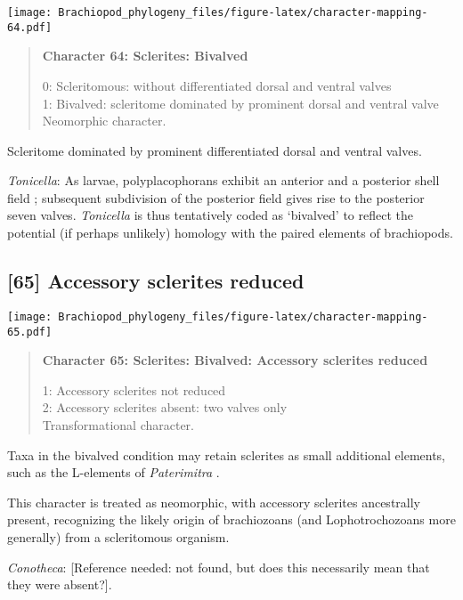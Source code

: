 \documentclass[openany]{book}
\theoremstyle{definition}
\theoremstyle{definition}
\theoremstyle{definition}
\theoremstyle{remark}
\begin{document}
\texttt{[image: Brachiopod\_phylogeny\_files/figure-latex/character-mapping-64.pdf]}

\begin{quote}
\textbf{Character 64: Sclerites: Bivalved}

0: Scleritomous: without differentiated dorsal and ventral valves\\
1: Bivalved: scleritome dominated by prominent dorsal and ventral
valve\\
Neomorphic character.
\end{quote}

Scleritome dominated by prominent differentiated dorsal and ventral
valves.

\hypertarget{Tonicella-coding-64}{}
\emph{Tonicella}: As larvae, polyplacophorans exhibit an anterior and a
posterior shell field \citep{Wanninger2002C}; subsequent subdivision of
the posterior field gives rise to the posterior seven valves.
\emph{Tonicella} is thus tentatively coded as `bivalved' to reflect the
potential (if perhaps unlikely) homology with the paired elements of
brachiopods.

\subsection*{{[}65{]} Accessory sclerites
reduced}\label{accessory-sclerites-reduced}

\texttt{[image: Brachiopod\_phylogeny\_files/figure-latex/character-mapping-65.pdf]}

\begin{quote}
\textbf{Character 65: Sclerites: Bivalved: Accessory sclerites reduced}

1: Accessory sclerites not reduced\\
2: Accessory sclerites absent: two valves only\\
Transformational character.
\end{quote}

Taxa in the bivalved condition may retain sclerites as small additional
elements, such as the L-elements of \emph{Paterimitra}
\citep{Skovsted2015Theearly}.

This character is treated as neomorphic, with accessory sclerites
ancestrally present, recognizing the likely origin of brachiozoans (and
Lophotrochozoans more generally) from a scleritomous organism.

\hypertarget{Conotheca-coding-65}{}
\emph{Conotheca}: {[}Reference needed: not found, but does this
necessarily mean that they were absent?{]}.
\end{document}
